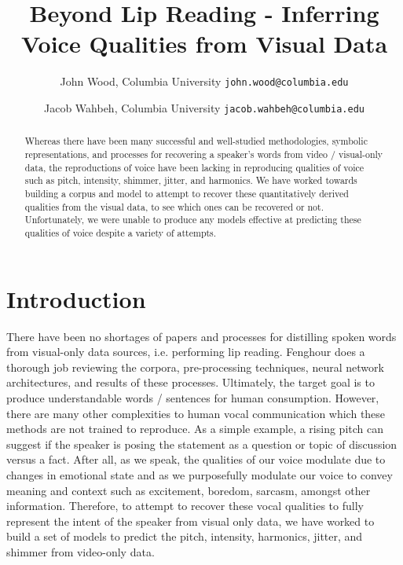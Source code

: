 \documentclass[10pt,twocolumn,letterpaper]{article}
\begin{document}
\title{Beyond Lip Reading - Inferring Voice Qualities from Visual Data}

\author{John Wood, 
Columbia University
{\tt\small john.wood@columbia.edu}
\and Jacob Wahbeh,
Columbia University
{\tt\small jacob.wahbeh@columbia.edu}
}
\maketitle

\begin{abstract}
   Whereas there have been many successful and well-studied methodologies, symbolic representations, and processes for recovering a speaker's words from video / visual-only data, the reproductions of voice have been lacking in reproducing qualities of voice such as pitch, intensity, shimmer, jitter, and harmonics. We have worked towards building a corpus and model to attempt to recover these quantitatively derived qualities from the visual data, to see which ones can be recovered or not. Unfortunately, we were unable to produce any models effective at predicting these qualities of voice despite a variety of attempts.
\end{abstract}

\section{Introduction}
\label{sec:intro}

There have been no shortages of papers and processes for distilling spoken words from visual-only data sources, i.e. performing lip reading. Fenghour  \cite{Fenghour2021} does a thorough job reviewing the corpora, pre-processing techniques, neural network architectures, and results of these processes. Ultimately, the target goal is to produce understandable words / sentences for human consumption. However, there are many other complexities to human vocal communication which these methods are not trained to reproduce. As a simple example, a rising pitch can suggest if the speaker is posing the statement as a question or topic of discussion versus a fact. After all, as we speak, the qualities of our voice modulate due to changes in emotional state and as we purposefully modulate our voice to convey meaning and context such as excitement, boredom, sarcasm, amongst other information. Therefore, to attempt to recover these vocal qualities to fully represent the intent of the speaker from visual only data, we have worked to build a set of models to predict the pitch, intensity, harmonics, jitter, and shimmer from video-only data.
\end{document}
